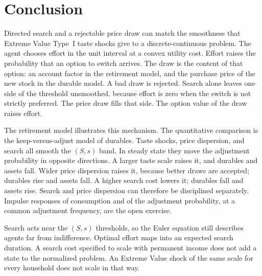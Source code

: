 \section{Conclusion}\label{sec:Conclusion}
Directed search and a rejectable price draw can match the smoothness that Extreme
Value Type~I taste shocks give to a discrete-continuous problem. The agent chooses
effort in the unit interval at a convex utility cost. Effort raises the probability that
an option to switch arrives. The draw is the content of that option: an account factor
in the retirement model, and the purchase price of the new stock in the durable model.
A bad draw is rejected. Search alone leaves one side of the threshold unsmoothed,
because effort is zero when the switch is not strictly preferred. The price draw fills
that side. The option value of the draw raises effort.

The retirement model illustrates this mechanism. The quantitative comparison is the
keep-versus-adjust model of durables. Taste shocks, price dispersion, and search all
smooth the $(S,s)$ band. In steady state they move the adjustment probability in
opposite directions. A larger taste scale raises it, and durables and assets fall.
Wider price dispersion raises it, because better draws are accepted; durables rise and
assets fall. A higher search cost lowers it; durables fall and assets rise. Search and
price dispersion can therefore be disciplined separately. Impulse responses of
consumption and of the adjustment probability, at a common adjustment frequency,
are the open exercise.

Search acts near the $(S,s)$ thresholds, so the Euler equation still describes agents
far from indifference. Optimal effort maps into an expected search duration. A search
cost specified to scale with permanent income does not add a state to the normalized
problem. An Extreme Value shock of the same scale for every household does not scale
in that way.
